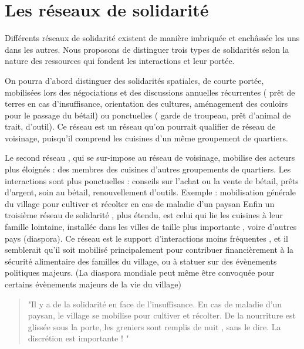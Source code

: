 \section{Les réseaux de solidarité}

%
%
%



Différents réseaux de solidarité existent de manière imbriquée et enchâssée les uns dans les autres. Nous proposons de distinguer trois types de solidarités selon la nature des ressources qui fondent les interactions et leur portée.

On pourra d'abord distinguer des solidarités spatiales, de courte portée,  mobilisées lors des négociations et des discussions annuelles récurrentes ( prêt de terres en cas d'insuffisance, orientation des cultures, aménagement des couloirs pour le passage du bétail) ou ponctuelles ( garde de troupeau, prêt d'animal de trait, d'outil).
Ce réseau est un réseau qu'on pourrait qualifier de réseau de  voisinage, puisqu'il comprend les cuisines d'un même groupement de quartiers.

Le second réseau , qui se sur-impose au réseau de voisinage,  mobilise des acteurs plus éloignés : des  membres des cuisines d'autres groupements de quartiers.
Les interactions sont plus ponctuelles : conseils sur l'achat ou la vente de bétail, prêts d'argent, soin au bétail, renouvellement d'outils. Exemple : mobilisation générale du village pour cultiver et récolter en cas de maladie d'un paysan
Enfin un troisième réseau de solidarité , plus étendu, est celui qui lie les cuisines à leur famille lointaine, installée dans les villes  de taille plus importante , voire d'autres pays (diaspora).
Ce réseau est le support d'interactions  moins fréquentes , et il semblerait qu'il soit mobilisé principalement pour contribuer financièrement à la sécurité alimentaire des familles du village, ou à statuer sur des évènements politiques majeurs. (La diaspora mondiale peut même être convoquée pour certains évènements majeurs de la vie du village)

\begin{quote}
  "Il y a de la solidarité en face de l’insuffisance. En cas de maladie d’un paysan, le village se mobilise pour cultiver et récolter. De la nourriture est glissée sous la porte, les greniers sont remplis de nuit , sans le dire. La discrétion est importante ! "
\end{quote}
